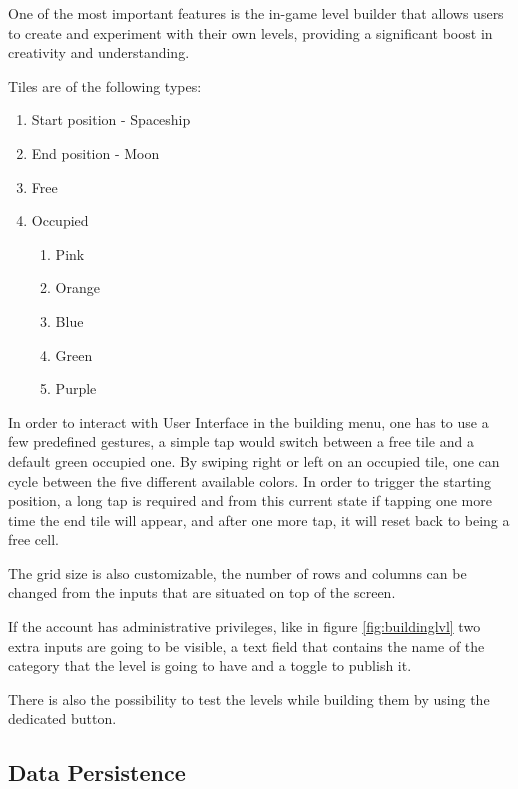 \documentclass[12 pct]{report}
\begin{document}
One of the most important features is the in-game level builder that allows users to create and experiment with their own levels, providing a significant boost in creativity and understanding. 

Tiles are of the following types:
\begin{enumerate}
\item Start position - Spaceship
\item End position - Moon
\item Free
\item Occupied
\begin{enumerate}
\item Pink
\item Orange
\item Blue
\item Green
\item Purple
\end{enumerate}
\end{enumerate}

In order to interact with User Interface in the building menu, one has to use a few predefined gestures, a simple tap would switch between a free tile and a default green occupied one. By swiping right or left on an occupied tile, one can cycle between the five different available colors. In order to trigger the starting position, a long tap is required and from this current state if tapping one more time the end tile will appear, and after one more tap, it will reset back to being a free cell.

The grid size is also customizable, the number of rows and columns can be changed from the inputs that are situated on top of the screen. 

If the account has administrative privileges, like in figure \ref{fig:buildinglvl} two extra inputs are going to be visible, a text field that contains the name of the category that the level is going to have and a toggle to publish it. 

There is also the possibility to test the levels while building them by using the dedicated button.

\subsection*{Data Persistence}
\end{document}
